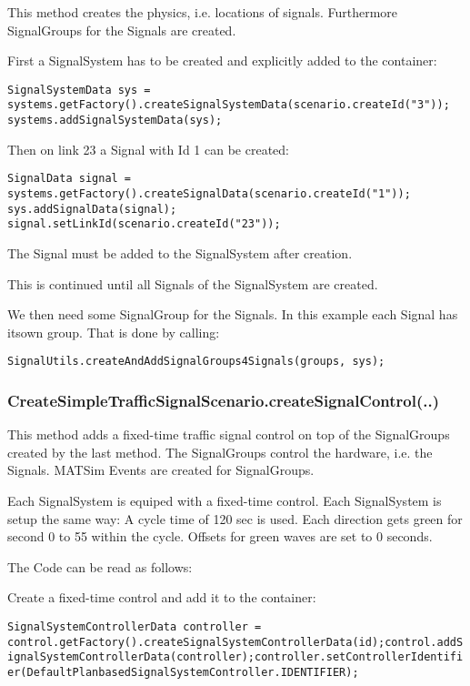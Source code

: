 This method creates the physics, i.e. locations of signals. Furthermore SignalGroups for the Signals are created.

First a SignalSystem has to be created and explicitly added to the container:


\texttt{\nolinebreak SignalSystemData sys = systems.getFactory().createSignalSystemData(scenario.createId("3"));
\\  \nolinebreak systems.addSignalSystemData(sys);}

Then on link 23 a Signal with Id 1 can be created:


\texttt{\nolinebreak SignalData signal = systems.getFactory().createSignalData(scenario.createId("1"));
\\\nolinebreak sys.addSignalData(signal);
\\\nolinebreak signal.setLinkId(scenario.createId("23"));}

The Signal must be added to the SignalSystem after creation.

This is continued until all Signals of the SignalSystem are created.

We then need some SignalGroup for the Signals. In this example each Signal has its\nolinebreak own group. That is done by calling:


\texttt{\nolinebreak SignalUtils.createAndAddSignalGroups4Signals(groups, sys);}

\subsubsection{CreateSimpleTrafficSignalScenario.createSignalControl(..)}

This method adds a fixed-time traffic signal control on top of the SignalGroups created by the last method. The SignalGroups control the hardware, i.e. the Signals. MATSim Events are created for SignalGroups.

Each SignalSystem is equiped with a fixed-time control. Each SignalSystem is setup the same way: A cycle time of 120 sec is used. Each direction gets green for second 0 to 55 within the cycle. Offsets for green waves are set to 0 seconds.

The Code can be read as follows:

Create a fixed-time control and add it to the container:


\texttt{\nolinebreak  SignalSystemControllerData controller = control.getFactory().createSignalSystemControllerData(id);\nolinebreak control.addSignalSystemControllerData(controller);\nolinebreak controller.setControllerIdentifier(DefaultPlanbasedSignalSystemController.IDENTIFIER);\nolinebreak }

